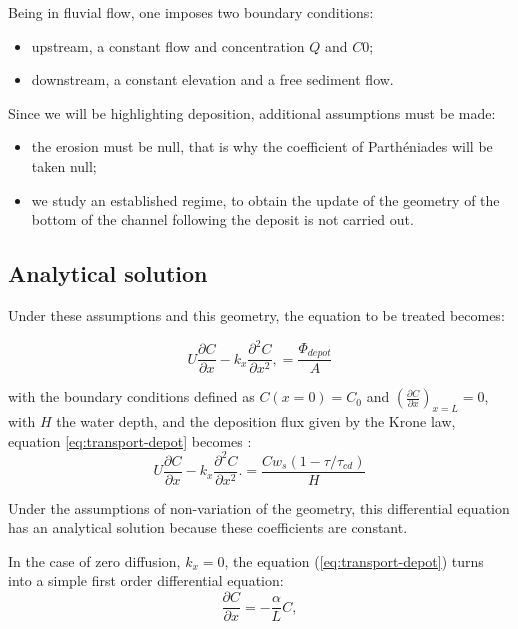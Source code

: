Being in fluvial flow, one imposes two boundary conditions:
\begin{itemize}
\item upstream, a constant flow and concentration $Q$ and $C0$;
\item downstream, a constant elevation and a free sediment flow.
\end{itemize}

Since we will be highlighting deposition, additional assumptions must
be made:
\begin{itemize}
\item the erosion must be null, that is why the coefficient of
Parthéniades will be taken null;
\item we study an established regime, to obtain the update of
the geometry of the bottom of the channel following the deposit
is not carried out.
\end{itemize}

\subsection{Analytical solution}

Under these assumptions and this geometry, the equation to be treated
becomes:

\begin{equation}
U \frac{\partial C}{\partial x} -
k_x \frac{\partial^2 C}{\partial x^2},
= \frac{ \Phi_{depot}}{ A}
\label{eq:transport-depot}
\end{equation}

with the boundary conditions defined as $C(x=0)=C_0$
and $\left(  \frac{\partial C}{\partial x}\right)_{x=L}=0 $,
with $H$ the water depth, and the deposition flux given by the Krone
law, equation \eqref{eq:transport-depot} becomes :
\begin{equation}
U \frac{\partial C}{\partial x} -
k_x \frac{\partial^2 C}{\partial x^2}.
= \frac{ C w_s (1- \tau/\tau_{cd})}{ H}
\label{eq:sol2}
\end{equation}

Under the assumptions of non-variation of the geometry, this
differential equation has an analytical solution because these
coefficients are constant.

In the case of zero diffusion, $k_x=0$, the equation
(\ref{eq:transport-depot}) turns into a simple first order
differential equation:
\begin{equation}
\frac{\partial C}{\partial x}=- \frac{\alpha}{L} C,
\label{eq:}
\end{equation}

